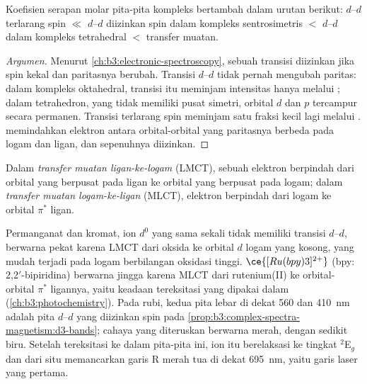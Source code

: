 \begin{proposition}\label{prop:b3:complex-spectra-magnetism:intensity-order}
Koefisien serapan molar pita-pita kompleks bertambah dalam urutan berikut:
$d$--$d$ terlarang spin $\ll$ $d$--$d$ diizinkan spin dalam kompleks sentrosimetris $<$ $d$--$d$
dalam kompleks tetrahedral $<$ transfer muatan.
\end{proposition}

\begin{proof}[Argumen]
Menurut \cref{ch:b3:electronic-spectroscopy}, sebuah transisi diizinkan jika spin
kekal dan paritasnya berubah. Transisi $d$--$d$ tidak pernah mengubah paritas: dalam
kompleks oktahedral, transisi itu meminjam intensitas hanya melalui ; dalam
tetrahedron, yang tidak memiliki pusat simetri, orbital $d$ dan $p$ tercampur secara permanen.
Transisi terlarang spin meminjam satu fraksi kecil lagi melalui .  memindahkan elektron antara
orbital-orbital yang paritasnya berbeda pada logam dan ligan, dan sepenuhnya
diizinkan.
\end{proof}

\begin{definition}\label{def:b3:complex-spectra-magnetism:ct}
Dalam \emph{transfer muatan ligan-ke-logam}
(LMCT), sebuah elektron berpindah dari orbital yang berpusat pada ligan ke orbital
yang berpusat pada logam; dalam \emph{transfer muatan logam-ke-ligan}
(MLCT), elektron berpindah dari logam ke orbital $\pi^*$ ligan.
\end{definition}

Permanganat dan kromat, ion $d^0$ yang sama sekali tidak memiliki transisi $d$--$d$, berwarna
pekat karena LMCT dari oksida ke orbital $d$ logam yang kosong, yang mudah terjadi pada logam
berbilangan oksidasi tinggi. $\ce{[Ru(bpy)3]^{2+}}$ (bpy: 2,2$'$-bipiridina) berwarna jingga karena MLCT
dari rutenium(II) ke orbital-orbital $\pi^*$ ligannya, yaitu keadaan tereksitasi yang dipakai dalam
 (\cref{ch:b3:photochemistry}). Pada rubi, kedua pita lebar
di dekat 560 dan \qty{410}{nm} adalah pita $d$--$d$ yang diizinkan spin pada
\cref{prop:b3:complex-spectra-magnetism:d3-bands}; cahaya yang diteruskan berwarna merah,
dengan sedikit biru. Setelah tereksitasi ke dalam pita-pita ini, ion itu berelaksasi ke tingkat $^2$E$_g$ dan
dari situ memancarkan garis R merah tua di dekat \qty{695}{nm}, yaitu garis laser yang pertama.

